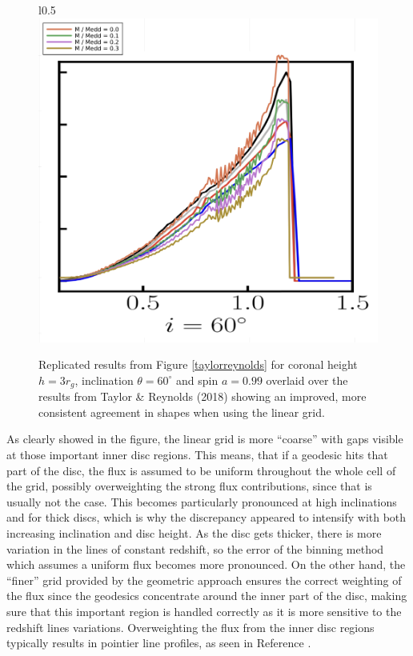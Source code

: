 \documentclass[fleqn,usenatbib,useAMS]{mnras}
\begin{document}
\begin{figure}{l}{0.5\textwidth}
\includegraphics[width=\linewidth]{figures/lineargrid.png}
\caption{Replicated results from Figure \ref{taylorreynolds} for coronal height $h = 3 r_{g}$, inclination $\theta = 60^{\circ}$ and spin $a = 0.99$ overlaid over the results from Taylor \& Reynolds (2018)\cite{taylor2018exploring} showing an improved, more consistent agreement in shapes when using the linear grid.}
\label{lineargrid}
\end{figure}

As clearly showed in the figure, the linear grid is more ``coarse'' with gaps visible at those important inner disc regions. This means, that if a geodesic hits that part of the disc, the flux is assumed to be uniform throughout the whole cell of the grid, possibly overweighting the strong flux contributions, since that is usually not the case. This becomes particularly pronounced at high inclinations and for thick discs, which is why the discrepancy appeared to intensify with both increasing inclination and disc height. As the disc gets thicker, there is more variation in the lines of constant redshift, so the error of the binning method which assumes a uniform flux becomes more pronounced. On the other hand, the ``finer'' grid provided by the geometric approach ensures the correct weighting of the flux since the geodesics concentrate around the inner part of the disc, making sure that this important region is handled correctly as it is more sensitive to the redshift lines variations. Overweighting the flux from the inner disc regions typically results in pointier line profiles, as seen in Reference \cite{taylor2018exploring}. 
\end{document}
